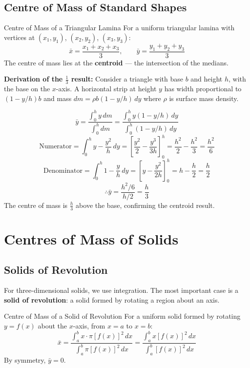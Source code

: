 \documentclass[12pt, a4paper]{book}
\begin{document}
\subsection{Centre of Mass of Standard Shapes}

\begin{thm}{Centre of Mass of a Triangular Lamina}{}
For a uniform triangular lamina with vertices at $(x_1,y_1)$, $(x_2,y_2)$, $(x_3,y_3)$:
\[
  \bar{x} = \frac{x_1 + x_2 + x_3}{3}, \qquad \bar{y} = \frac{y_1 + y_2 + y_3}{3}
\]
The centre of mass lies at the \textbf{centroid} --- the intersection of the medians.
\end{thm}

\textbf{Derivation of the $\frac{1}{3}$ result:} Consider a triangle with base $b$ and height $h$, with the base on the $x$-axis. A horizontal strip at height $y$ has width proportional to $(1 - y/h)b$ and mass $dm = \rho b(1-y/h)\,dy$ where $\rho$ is surface mass density.

\[
  \bar{y} = \frac{\int_0^h y\,dm}{\int_0^h dm} = \frac{\int_0^h y(1-y/h)\,dy}{\int_0^h (1-y/h)\,dy}
\]
\[
  \text{Numerator} = \int_0^h y - \frac{y^2}{h}\,dy = \left[\frac{y^2}{2} - \frac{y^3}{3h}\right]_0^h = \frac{h^2}{2} - \frac{h^2}{3} = \frac{h^2}{6}
\]
\[
  \text{Denominator} = \int_0^h 1 - \frac{y}{h}\,dy = \left[y - \frac{y^2}{2h}\right]_0^h = h - \frac{h}{2} = \frac{h}{2}
\]
\[
  \therefore \bar{y} = \frac{h^2/6}{h/2} = \frac{h}{3}
\]
The centre of mass is $\frac{h}{3}$ above the base, confirming the centroid result.

\section{Centres of Mass of Solids}

\subsection{Solids of Revolution}

For three-dimensional solids, we use integration. The most important case is a \textbf{solid of revolution}: a solid formed by rotating a region about an axis.

\begin{thm}{Centre of Mass of a Solid of Revolution}{}
For a uniform solid formed by rotating $y = f(x)$ about the $x$-axis, from $x = a$ to $x = b$:
\[
  \bar{x} = \frac{\int_a^b x \cdot \pi[f(x)]^2\,dx}{\int_a^b \pi[f(x)]^2\,dx} = \frac{\int_a^b x[f(x)]^2\,dx}{\int_a^b [f(x)]^2\,dx}
\]
By symmetry, $\bar{y} = 0$.
\end{thm}
\end{document}
